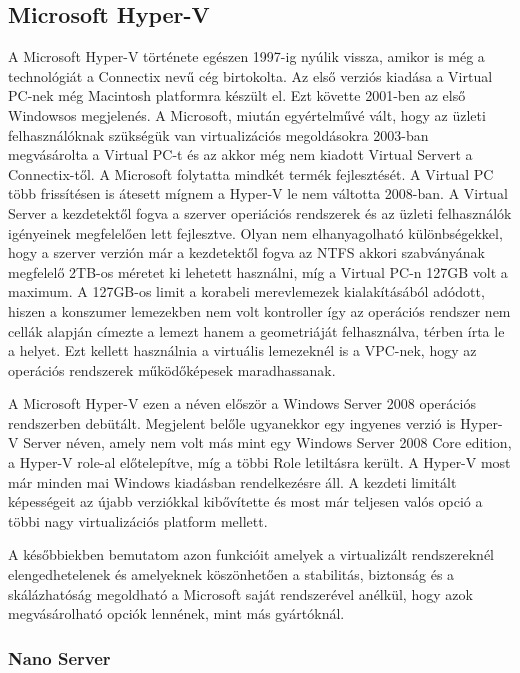 \documentclass[12pt,oneside,justify,table]{book}
\begin{document}
\subsection{Microsoft Hyper-V\texttrademark}

A Microsoft Hyper-V története egészen 1997-ig nyúlik vissza, amikor is még a technológiát a Connectix nevű cég birtokolta. 
Az első verziós kiadása a Virtual PC-nek még Macintosh platformra készült el. 
Ezt követte 2001-ben az első Windowsos megjelenés. 
A Microsoft, miután egyértelművé vált, hogy az üzleti felhasználóknak szükségük van virtualizációs megoldásokra 2003-ban megvásárolta a Virtual PC-t és az akkor még nem kiadott Virtual Servert a Connectix-től. 
A Microsoft folytatta mindkét termék fejlesztését. A Virtual PC több frissítésen is átesett mígnem a Hyper-V le nem váltotta 2008-ban. 
A Virtual Server a kezdetektől fogva a szerver operiációs rendszerek és az üzleti felhasználók igényeinek megfelelően lett fejlesztve. 
Olyan nem elhanyagolható különbségekkel, hogy a szerver verzión már a kezdetektől fogva az NTFS akkori szabványának megfelelő 2TB-os méretet ki lehetett használni, míg a Virtual PC-n 127GB volt a maximum. 
A 127GB-os limit a korabeli merevlemezek kialakításából adódott, hiszen a konszumer lemezekben nem volt kontroller így az operációs rendszer nem cellák alapján címezte a lemezt hanem a geometriáját felhasználva, térben írta le a helyet. Ezt kellett használnia a virtuális lemezeknél is a VPC-nek, hogy az operációs rendszerek működőképesek maradhassanak.

A Microsoft Hyper-V ezen a néven először a Windows Server 2008 operációs rendszerben debütált. 
Megjelent belőle ugyanekkor egy ingyenes verzió is Hyper-V Server néven, amely nem volt más mint egy Windows Server 2008 Core edition, a Hyper-V role-al előtelepítve, míg a többi Role letiltásra került.
A Hyper-V most már minden mai Windows kiadásban rendelkezésre áll. A kezdeti limitált képességeit az újabb verziókkal kibővítette és most már teljesen valós opció a többi nagy virtualizációs platform mellett. 

A későbbiekben bemutatom azon funkcióit amelyek a virtualizált rendszereknél elengedhetelenek és amelyeknek köszönhetően a stabilitás, biztonság és a skálázhatóság megoldható a Microsoft saját rendszerével anélkül, hogy azok megvásárolható opciók lennének, mint más gyártóknál.

\subsubsection{Nano Server}
\end{document}
